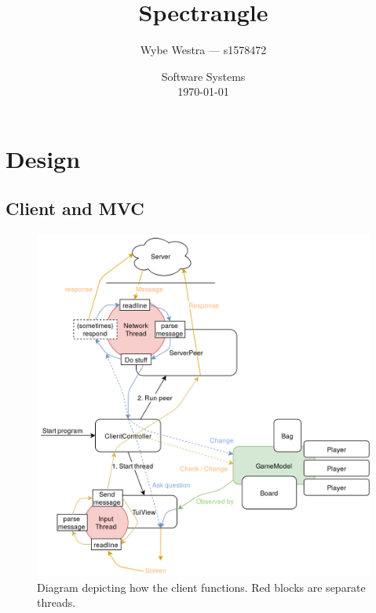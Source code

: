 \documentclass[12pt, letterpaper]{article}
\title{Spectrangle}
\author{Wybe Westra --- s1578472}
\date{Software Systems \\ \today}
\begin{document}
    \maketitle

    \newpage

    \tableofcontents

    \newpage


    \section{Design}


    \subsection{Client and MVC}

    \begin{figure}[t]
        \begin{center}
            \includegraphics[width=\textwidth]{Client.png}
            \caption{Diagram depicting how the client functions.
            Red blocks are separate threads.}
            \label{fig:clientDiagram}
        \end{center}
    \end{figure}
\end{document}
